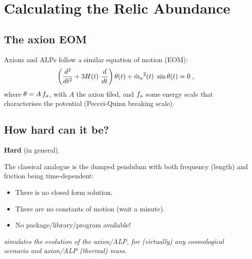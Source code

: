 \documentclass[10pt,utf8,compress,xcolor=dvipsnames]{beamer}
\begin{document}
\section{Calculating the Relic Abundance}
\subsection{The axion EOM}
\begin{frame}{\insertsubsectionhead}
	Axions and ALPs follow a similar equation of motion (EOM):
	\begin{equation*}
		\left( \dfrac{d^2}{d t^2} + 3 H(t) \ \dfrac{d}{d t}  \right) \theta(t) + \tilde m_{a}{}^2(t) \ \sin \theta(t) = 0 \; ,
	\end{equation*}	
	where $\theta= A \, f_{a}{}$, with $A$ the axion filed, and $f_{a}{}$ some energy scale that characterises the potential (Peccei-Quinn breaking scale).


\end{frame}

\subsection{How hard can it be?}
\begin{frame}{\insertsubsectionhead}
	\begin{center}
		\textbf{Hard} (in general).\\[1cm]\pause
	\end{center}	

	The classical analogue is the dumped pendulum with both frequency (length) and friction being time-dependent:
	\begin{itemize}
		\item There is no closed form solution.
		\item There are no constants of motion (wait a minute).
		\item No package/library/program available!\pause\\[2cm]
	\end{itemize}

	\begin{center}
		{\sl \mimes simulates the evolution of the axion/ALP, for (virtually) any cosmological scenario and axion/ALP (thermal) mass.}
	\end{center}		
\end{frame}
\end{document}
